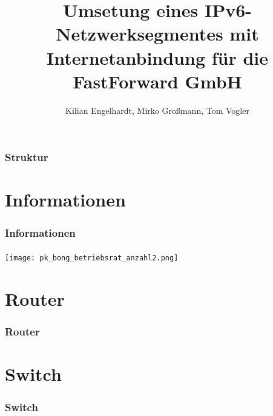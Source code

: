 \documentclass{beamer}
\title[Jahresprojekt FS22 - Gruppe 8]{Umsetung eines IPv6-Netzwerksegmentes mit Internetanbindung für die FastForward GmbH} %
\author{Kilian Engelhardt, Mirko Großmann, Tom Vogler} %
\begin{document}
\begin{frame}
\titlepage %
\end{frame}

\begin{frame}
\frametitle{Struktur} %
\tableofcontents %
\end{frame}


\section{Informationen}
\begin{frame}[label=informationen]
\frametitle{Informationen}
\end{frame}

\begin{frame}
\frametitle{}

\texttt{[image: pk\_bong\_betriebsrat\_anzahl2.png]}

\end{frame}
\section{Router}
\begin{frame}[label=router]
\frametitle{Router}
\end{frame}
\section{Switch}
\begin{frame}[label=switch]
\frametitle{Switch}
\end{frame}
\end{document}
